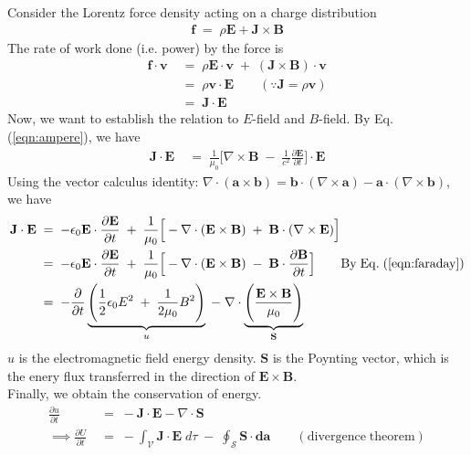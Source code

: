 \documentclass[12pt,a4paper]{article}
\begin{document}
Consider the Lorentz force density acting on a charge distribution
\begin{align}
	\mathbf{f} \; = \; \rho \mathbf{E} + \mathbf{J} \times \mathbf{B} 
\end{align}
The rate of work done (i.e. power) by the force is
\begin{align}
	\mathbf{f} \cdot \mathbf{v} \; &= \; \rho \mathbf{E} \cdot \mathbf{v} 
	\; + \;
	 (\mathbf{J} \times \mathbf{B}) \cdot \mathbf{v} \\
	 \; &= \; \rho \mathbf{v} \cdot \mathbf{E} \qquad  (\because \mathbf{J} =\rho \mathbf{v}) \\
	 \; &= \; \mathbf{J} \cdot \mathbf{E}
\end{align}
Now, we want to establish the relation to $E$-field and $B$-field. By Eq. (\ref{eqn:ampere}), we have
\begin{align}
	\mathbf{J} \cdot \mathbf{E}
	\; &= \;
	\frac{1}{\mu_{0}} \Big[ \nabla \times \mathbf{B} \; - \; \frac{1}{c^{2}} \frac{\partial \mathbf{E}}{\partial t} \Big] \cdot \mathbf{E}
\end{align}
Using the vector calculus identity: $\nabla \cdot (\mathbf{a} \times \mathbf{b}) = \mathbf{b} \cdot (\nabla \times \mathbf{a}) - \mathbf{a} \cdot (\nabla \times \mathbf{b})$, we have
\begin{align}
	\mathbf{J} \cdot \mathbf{E}
	\; &= \;
	- \epsilon_{0} \mathbf{E} \cdot \frac{\partial \mathbf{E}}{\partial t} 
	\; + \;
	\frac{1}{\mu_{0}} \Big[ 
	-\nabla \cdot ( \mathbf{E} \times \mathbf{B})
	\; + \;
	\mathbf{B} \cdot (\nabla \times \mathbf{E})  \Big]\\
	\; &= \;
	- \epsilon_{0} \mathbf{E} \cdot \frac{\partial \mathbf{E}}{\partial t} 
	\; + \;
	\frac{1}{\mu_{0}} \Big[ 
	-\nabla \cdot ( \mathbf{E} \times \mathbf{B})
	\; - \;
	\mathbf{B} \cdot \frac{\partial \mathbf{B}}{\partial t}  \Big] \qquad \mathrm{By \; Eq. \;} (\ref{eqn:faraday})\\
	\; &= \;
	- \frac{\partial}{\partial t}
	\underbrace{
		\Bigg( \frac{1}{2} \epsilon_{0} E^{2}
		\; + \;
		\frac{1}{2 \mu_{0}} B^{2} \Bigg)
	}_{u}
	\; - \; 
	\nabla \cdot 
	\underbrace{
		\Bigg( \frac{\mathbf{E} \times \mathbf{B}}{\mu_{0}} \Bigg)
	}_{\mathbf{S}} \label{eqn:tmp_fv}
\end{align}
$u$ is the electromagnetic field energy density. $\mathbf{S}$ is the Poynting vector, which is the enery flux transferred in the direction of $\mathbf{E} \times \mathbf{B}$.\\

Finally, we obtain the conservation of energy.
\begin{align}
	\frac{\partial u}{\partial t} \; &= \; - \mathbf{J} \cdot \mathbf{E} - \nabla \cdot \mathbf{S} \\
	\implies \frac{\partial U}{\partial t} \; &= \; - \int_{\mathcal{V}}  \mathbf{J} \cdot \mathbf{E} \; d\tau \; - \; \oint_{\mathcal{S}} \mathbf{S} \cdot \mathbf{da}
	\qquad \mathrm{(divergence \; theorem)} 
\end{align}
\end{document}
